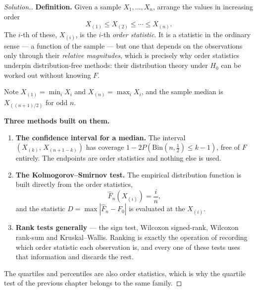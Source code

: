 \documentclass[11pt,a4paper]{article}
\theoremstyle{definition}
\newenvironment{solution}
  {\renewcommand{\qedsymbol}{}\begin{proof}[\textit{Solution}.]}
  {\end{proof}}
\begin{document}
\begin{solution}
\textbf{Definition.} Given a sample $X_1,\ldots,X_n$, arrange the values in
increasing order
$$X_{(1)} \leq X_{(2)} \leq \cdots \leq X_{(n)} .$$
The $i$-th of these, $X_{(i)}$, is the $i$-th \emph{order statistic}. It is a
statistic in the ordinary sense --- a function of the sample --- but one that depends
on the observations only through their \emph{relative magnitudes}, which is
precisely why order statistics underpin distribution-free methods: their
distribution theory under $H_0$ can be worked out without knowing $F$.

Note $X_{(1)} = \min_i X_i$ and $X_{(n)} = \max_i X_i$, and the sample median is
$X_{((n+1)/2)}$ for odd $n$.

\textbf{Three methods built on them.}

\begin{enumerate}
\item[(i).] \textbf{The confidence interval for a median.} The interval
$\left(X_{(k)},\,X_{(n+1-k)}\right)$ has coverage
$1 - 2P\!\left(\text{Bin}(n,\tfrac12) \leq k-1\right)$, free of $F$ entirely. The
endpoints are order statistics and nothing else is used.

\item[(ii).] \textbf{The Kolmogorov--Smirnov test.} The empirical distribution
function is built directly from the order statistics,
$$\widehat{F}_n\left(X_{(i)}\right) = \dfrac{i}{n},$$
and the statistic $D = \max\left|\widehat{F}_n - F_0\right|$ is evaluated at the
$X_{(i)}$.

\item[(iii).] \textbf{Rank tests generally} --- the sign test, Wilcoxon
signed-rank, Wilcoxon rank-sum and Kruskal--Wallis. Ranking is exactly the
operation of recording which order statistic each observation is, and every one of
these tests uses that information and discards the rest.
\end{enumerate}

The quartiles and percentiles are also order statistics, which is why the quartile
test of the previous chapter belongs to the same family.
\end{solution}

\pagebreak
\end{document}
